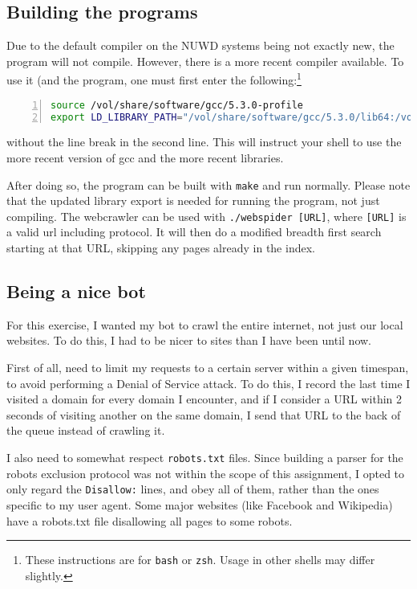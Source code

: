 \documentclass[12pt,a4paper]{article}
\begin{document}
\subsection{Building the programs}

Due to the default compiler on the NUWD systems being not exactly new, the program will not compile. However, there is a more recent compiler available. To use it (and the program, one must first enter the following:\footnote{These instructions are for \texttt{bash} or \texttt{zsh}. Usage in other shells may differ slightly.}

\begin{lstlisting}[breaklines,numbers=left,language=bash]
source /vol/share/software/gcc/5.3.0-profile
export LD_LIBRARY_PATH="/vol/share/software/gcc/5.3.0/lib64:/vol/share/software/gcc/5.3.0/lib32:$LD_LIBRARY_PATH"
\end{lstlisting}
without the line break in the second line. This will instruct your shell to use the more recent version of gcc and the more recent libraries.

After doing so, the program can be built with \texttt{make} and run normally. Please note that the updated library export is needed for running the program, not just compiling. The webcrawler can be used with \texttt{./webspider [URL]}, where \texttt{[URL]} is a valid url including protocol. It will then do a modified breadth first search starting at that URL, skipping any pages already in the index.

\subsection{Being a nice bot}

For this exercise, I wanted my bot to crawl the entire internet, not just our local websites. To do this, I had to be nicer to sites than I have been until now.

First of all, need to limit my requests to a certain server within a given timespan, to avoid performing a Denial of Service attack. To do this, I record the last time I visited a domain for every domain I encounter, and if I consider a URL within 2 seconds of visiting another on the same domain, I send that URL to the back of the queue instead of crawling it.

I also need to somewhat respect \texttt{robots.txt} files. Since building a parser for the robots exclusion protocol was not within the scope of this assignment, I opted to only regard the \texttt{Disallow:} lines, and obey all of them, rather than the ones specific to my user agent. Some major websites (like Facebook and Wikipedia) have a robots.txt file disallowing all pages to some robots.
\end{document}
